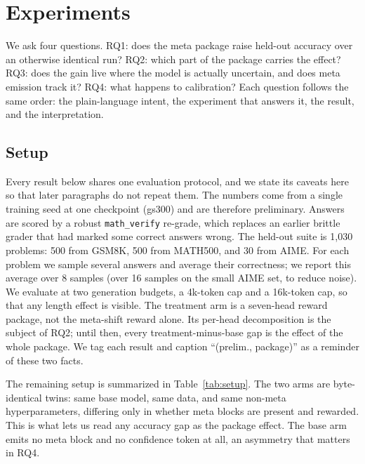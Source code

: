 \section{Experiments}
\label{sec:experiments}

We ask four questions. RQ1: does the meta package raise held-out accuracy
over an otherwise identical run? RQ2: which part of the package carries the
effect? RQ3: does the gain live where the model is actually uncertain, and
does meta emission track it? RQ4: what happens to calibration? Each question
follows the same order: the plain-language intent, the experiment that
answers it, the result, and the interpretation.

\subsection{Setup}
\label{sec:exp:setup}

Every result below shares one evaluation protocol, and we state its caveats
here so that later paragraphs do not repeat them. The numbers come from a
single training seed at one checkpoint (gs300) and are therefore
preliminary. Answers are scored by a robust \texttt{math\_verify} re-grade,
which replaces an earlier brittle grader that had marked some correct
answers wrong. The held-out suite is 1{,}030 problems: 500 from GSM8K, 500
from MATH500, and 30 from AIME. For each problem we sample several answers
and average their correctness; we report this average over 8 samples (over
16 samples on the small AIME set, to reduce noise). We evaluate at two
generation budgets, a 4k-token cap and a 16k-token cap, so that any length
effect is visible. The treatment arm is a seven-head reward package, not the
meta-shift reward alone. Its per-head decomposition is the subject of RQ2;
until then, every treatment-minus-base gap is the effect of the whole
package. We tag each result and caption ``(prelim., package)'' as a reminder
of these two facts.

The remaining setup is summarized in Table~\ref{tab:setup}. The two arms are
byte-identical twins: same base model, same data, and same non-meta
hyperparameters, differing only in whether meta blocks are present and
rewarded. This is what lets us read any accuracy gap as the package effect.
The base arm emits no meta block and no confidence token at all, an
asymmetry that matters in RQ4.

